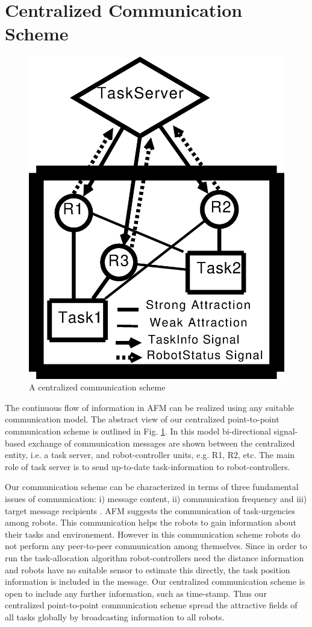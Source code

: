 \documentclass[smallcondensed]{svjour3}
\begin{document}
\section{Centralized Communication Scheme}
\label{sec:comm}
\begin{figure}
\centering
\includegraphics[height=0.5\textwidth, angle=0]{./images/CentralizedComm.eps}
\caption{\small A centralized communication scheme} %
\label{fig:ccm} %
\end{figure}
The continuous flow of information in AFM can be realized using any suitable communication model. The abstract view of our centralized point-to-point communication scheme is outlined in Fig. \ref{fig:ccm}. In this model bi-directional signal-based exchange of communication messages are shown between the centralized entity, i.e. a task server, and robot-controller units, e.g. R1, R2, etc. The main role of task server is to send up-to-date task-information to robot-controllers. 

Our communication scheme can be characterized in terms of three fundamental issues of communication: i) message content, ii) communication frequency and iii) target message recipients \citep{Gerkey+2001}. AFM suggests the communication of task-urgencies among robots. This communication helps the robots to gain information about their tasks and environement. However in this communication scheme robots do not perform any peer-to-peer communication among themselves. Since in order to run the task-allocation algorithm robot-controllers need the distance information and robots have no suitable sensor to estimate this directly, the task position information is included in the message. Our centralized communication scheme is open to include any further information, such as time-stamp. Thus our centralized point-to-point communication scheme spread the attractive fields of all tasks globally by broadcasting information to all robots.
\end{document}
